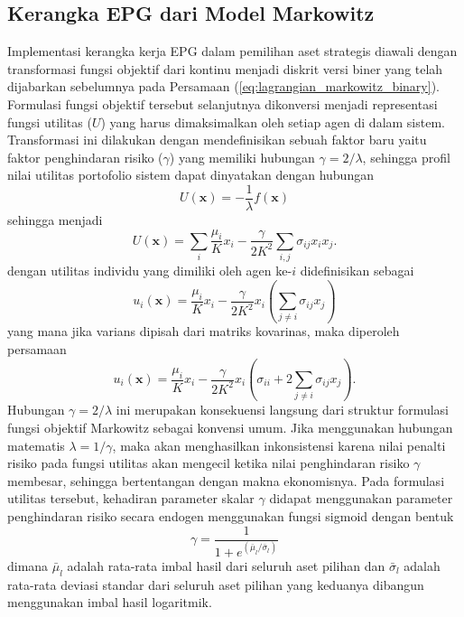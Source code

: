 \subsection{Kerangka EPG dari Model Markowitz}
Implementasi kerangka kerja EPG dalam pemilihan aset strategis diawali dengan transformasi fungsi objektif dari kontinu menjadi diskrit versi biner yang telah dijabarkan sebelumnya pada Persamaan (\ref{eq:lagrangian_markowitz_binary}). Formulasi fungsi objektif tersebut selanjutnya dikonversi menjadi representasi fungsi utilitas ($U$) yang harus dimaksimalkan oleh setiap agen di dalam sistem. Transformasi ini dilakukan dengan mendefinisikan sebuah faktor baru yaitu faktor penghindaran risiko ($\gamma$) yang memiliki hubungan $\gamma = 2/\lambda$, sehingga profil nilai utilitas portofolio sistem dapat dinyatakan dengan hubungan
\begin{equation*}
U(\mathbf{x}) = - \frac{1}{\lambda} f(\mathbf{x})
\end{equation*}
sehingga menjadi
\begin{equation}
\label{eq:utilitas_biner}
U(\mathbf{x}) = \sum_i \frac{\mu_i}{K} x_i - \frac{\gamma}{2K^2} \sum_{i,j} \sigma_{ij} x_i x_j.
\end{equation}
dengan utilitas individu yang dimiliki oleh agen ke-$i$ didefinisikan sebagai
\begin{equation}
    u_i(\mathbf{x}) = \frac{\mu_i}{K} x_i - \frac{\gamma}{2K^2} x_i \left( \sum_{j \neq i} \sigma_{ij} x_j \right)
\label{eq:utilitas_individu}
\end{equation}
yang mana jika varians dipisah dari matriks kovarinas, maka diperoleh persamaan 
\begin{equation}
    u_i(\mathbf{x}) = \frac{\mu_i}{K} x_i - \frac{\gamma}{2K^2} x_i \left( \sigma_{ii} + 2\sum_{j \neq i} \sigma_{ij} x_j \right).
    \label{eq:utilitas_individu_varian}
\end{equation}
Hubungan $\gamma = 2/\lambda$ ini merupakan konsekuensi langsung dari struktur formulasi fungsi objektif Markowitz sebagai konvensi umum. Jika menggunakan hubungan matematis $\lambda = 1/\gamma$, maka akan menghasilkan inkonsistensi karena nilai penalti risiko pada fungsi utilitas akan mengecil ketika nilai penghindaran risiko $\gamma$ membesar, sehingga bertentangan dengan makna ekonomisnya. Pada formulasi utilitas tersebut, kehadiran parameter skalar $\gamma$ didapat menggunakan parameter penghindaran risiko secara endogen menggunakan fungsi sigmoid dengan bentuk
\begin{equation}
    \gamma = \frac{1}{1 + e^{(\bar{\mu}_l/\bar{\sigma}_l)}}
    \label{eq:risk_aversion}
\end{equation}
dimana $\bar{\mu}_l$ adalah rata-rata imbal hasil dari seluruh aset pilihan dan $\bar{\sigma}_l$ adalah rata-rata deviasi standar dari seluruh aset pilihan yang keduanya dibangun menggunakan imbal hasil logaritmik.


